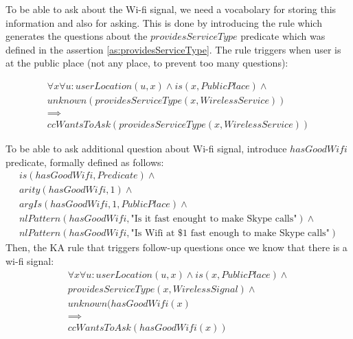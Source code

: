 To be able to ask about the Wi-fi signal, we need a vocabolary for storing this
information and also for asking. This is done by introducing the rule which
generates the questions about the $providesServiceType$ predicate which was
defined in the assertion \ref{as:providesServiceType}. The rule triggers
when user is at the public place (not any place, to prevent too many questions):

\begin{equation}\label{rule:haswifi}
\begin{gathered}
	\forall x\forall u: userLocation(u,x) \land
	is (x,PublicPlace) \land \\
	unknown(providesServiceType(x,WirelessService))\\
	\implies \\
	ccWantsToAsk(providesServiceType(x,WirelessService))
\end{gathered}
\end{equation}

\begin{definition}\label{def:hasGoodWifi}
To be able to ask additional question about Wi-fi signal, introduce 
$hasGoodWifi$ predicate, formally defined as follows:
\begin{equation}\label{as:hasGoodWifi}
\begin{gathered}
	is(hasGoodWifi, Predicate) \land \\
	arity(hasGoodWifi,1) \land \\
	argIs(hasGoodWifi,1,PublicPlace) \land \\
	nlPattern(hasGoodWifi,\text{"Is it fast enought to make Skype calls"})\land\\
	nlPattern(hasGoodWifi,\text{"Is Wifi at \$1 fast enough to make Skype calls"})
\end{gathered}
\end{equation}
Then, the KA rule that triggers follow-up questions once we know that there
is a wi-fi signal:
\begin{equation}\label{rule:hasGoodWifi}
\begin{gathered}
	\forall x\forall u: userLocation(u,x) \land
	is (x,PublicPlace) \land \\
	providesServiceType(x,WirelessSignal) \land \\
	unknown(hasGoodWifi(x) \\
	\implies \\
	ccWantsToAsk(hasGoodWifi(x))
\end{gathered}
\end{equation}
\end{definition}

